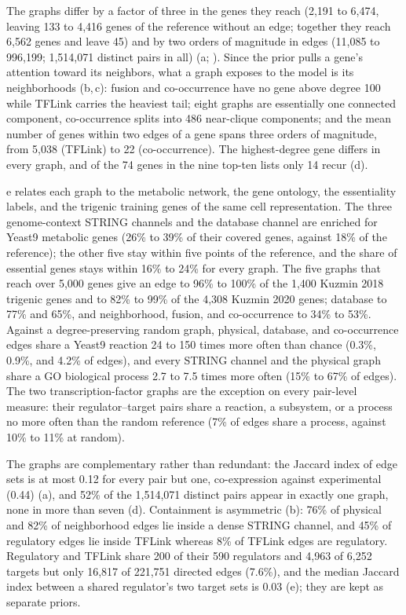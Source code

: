  The graphs differ by a factor of three in the genes they
reach (2,191 to 6,474, leaving 133 to 4,416 genes of the reference without an edge; together they
reach 6,562 genes and leave 45) and by two orders of magnitude in edges (11,085 to 996,199;
1,514,071 distinct pairs in all) (a; ). Since
the prior pulls a gene's attention toward its neighbors, what a graph exposes to the model is its
neighborhoods (b,\,c): fusion and co-occurrence have no gene above
degree 100 while TFLink carries the heaviest tail; eight graphs are essentially one connected
component, co-occurrence splits into 486 near-clique components; and the mean number of genes
within two edges of a gene spans three orders of magnitude, from 5,038 (TFLink) to 22
(co-occurrence). The highest-degree gene differs in every graph, and of the 74 genes in the nine
top-ten lists only 14 recur (d).

 e relates each graph to the metabolic
network, the gene ontology, the essentiality labels, and the trigenic training genes of the same
cell representation. The three genome-context STRING channels and the database channel are
enriched for Yeast9 metabolic genes (26\% to 39\% of their covered genes, against 18\% of the
reference); the other five stay within five points of the reference, and the share of essential
genes stays within 16\% to 24\% for every graph. The five graphs that reach over 5,000 genes
give an edge to 96\% to 100\% of the 1,400 Kuzmin 2018 trigenic genes and to 82\% to 99\% of the
4,308 Kuzmin 2020 genes; database to 77\% and 65\%, and neighborhood, fusion, and co-occurrence
to 34\% to 53\%. Against a degree-preserving random graph, physical, database, and co-occurrence
edges share a Yeast9 reaction 24 to 150 times more often than chance (0.3\%, 0.9\%, and 4.2\%
of edges), and every STRING channel and the physical graph share a GO biological process 2.7 to
7.5 times more often (15\% to 67\% of edges). The two transcription-factor graphs are the
exception on every pair-level measure: their regulator--target pairs share a reaction, a
subsystem, or a process no more often than the random reference (7\% of edges share a process,
against 10\% to 11\% at random).

 The graphs are complementary rather than redundant: the Jaccard index of edge
sets is at most 0.12 for every pair but one, co-expression against experimental (0.44)
(a), and 52\% of the 1,514,071 distinct pairs appear in exactly one
graph, none in more than seven (d). Containment is asymmetric
(b): 76\% of physical and 82\% of neighborhood edges lie inside a
dense STRING channel, and 45\% of regulatory edges lie inside TFLink whereas 8\% of TFLink edges
are regulatory. Regulatory and TFLink share 200 of their 590 regulators and 4,963 of 6,252
targets but only 16,817 of 221,751 directed edges (7.6\%), and the median Jaccard index between
a shared regulator's two target sets is 0.03 (e); they are kept as
separate priors.


